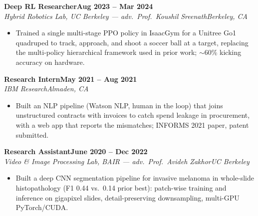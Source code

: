 \documentclass[10pt]{article}
\newcommand{\role}[4]{\par\vspace{3pt}\textbf{#1}\hfill\textbf{#2}\\\textit{#3}\hfill\textit{#4}}
\begin{document}
\role{Deep RL Researcher}{Aug 2023 -- Mar 2024}{Hybrid Robotics Lab, UC Berkeley --- adv.\ Prof.\ Koushil Sreenath}{Berkeley, CA}
\begin{itemize}
\item Trained a single multi-stage PPO policy in IsaacGym for a Unitree Go1 quadruped to track, approach, and shoot a soccer ball at a target, replacing the multi-policy hierarchical framework used in prior work; $\sim$60\% kicking accuracy on hardware.
\end{itemize}

\role{Research Intern}{May 2021 -- Aug 2021}{IBM Research}{Almaden, CA}
\begin{itemize}
\item Built an NLP pipeline (Watson NLP, human in the loop) that joins unstructured contracts with invoices to catch spend leakage in procurement, with a web app that reports the mismatches; INFORMS 2021 paper, patent submitted.
\end{itemize}

\role{Research Assistant}{June 2020 -- Dec 2022}{Video \& Image Processing Lab, BAIR --- adv.\ Prof.\ Avideh Zakhor}{UC Berkeley}
\begin{itemize}
\item Built a deep CNN segmentation pipeline for invasive melanoma in whole-slide histopathology (F1 0.44 vs.\ 0.14 prior best): patch-wise training and inference on gigapixel slides, detail-preserving downsampling, multi-GPU PyTorch/CUDA.
\end{itemize}

\end{document}
